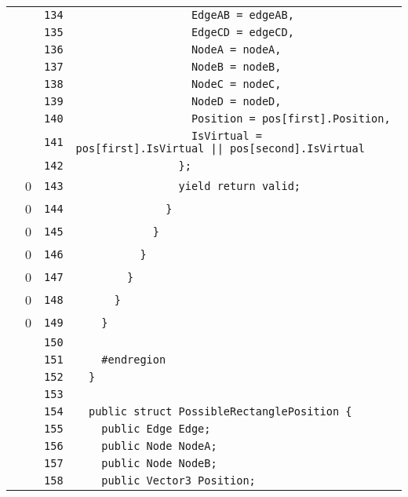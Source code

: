 \documentclass[a4paper,10pt]{article}
\begin{document}
\begin{longtable}[l]{lrrl}
\cellcolor{gray} &  & \verb~134~ & \verb~                  EdgeAB = edgeAB,~\\
\cellcolor{gray} &  & \verb~135~ & \verb~                  EdgeCD = edgeCD,~\\
\cellcolor{gray} &  & \verb~136~ & \verb~                  NodeA = nodeA,~\\
\cellcolor{gray} &  & \verb~137~ & \verb~                  NodeB = nodeB,~\\
\cellcolor{gray} &  & \verb~138~ & \verb~                  NodeC = nodeC,~\\
\cellcolor{gray} &  & \verb~139~ & \verb~                  NodeD = nodeD,~\\
\cellcolor{gray} &  & \verb~140~ & \verb~                  Position = pos[first].Position,~\\
\cellcolor{gray} &  & \verb~141~ & \verb~                  IsVirtual = pos[first].IsVirtual || pos[second].IsVirtual~\\
\cellcolor{gray} &  & \verb~142~ & \verb~                };~\\
\cellcolor{red} & 0 & \verb~143~ & \verb~                yield return valid;~\\
\cellcolor{red} & 0 & \verb~144~ & \verb~              }~\\
\cellcolor{red} & 0 & \verb~145~ & \verb~            }~\\
\cellcolor{red} & 0 & \verb~146~ & \verb~          }~\\
\cellcolor{red} & 0 & \verb~147~ & \verb~        }~\\
\cellcolor{red} & 0 & \verb~148~ & \verb~      }~\\
\cellcolor{red} & 0 & \verb~149~ & \verb~    }~\\
\cellcolor{gray} &  & \verb~150~ & \verb~~\\
\cellcolor{gray} &  & \verb~151~ & \verb~    #endregion~\\
\cellcolor{gray} &  & \verb~152~ & \verb~  }~\\
\cellcolor{gray} &  & \verb~153~ & \verb~~\\
\cellcolor{gray} &  & \verb~154~ & \verb~  public struct PossibleRectanglePosition {~\\
\cellcolor{gray} &  & \verb~155~ & \verb~    public Edge Edge;~\\
\cellcolor{gray} &  & \verb~156~ & \verb~    public Node NodeA;~\\
\cellcolor{gray} &  & \verb~157~ & \verb~    public Node NodeB;~\\
\cellcolor{gray} &  & \verb~158~ & \verb~    public Vector3 Position;~\\

\end{longtable}
\end{document}
